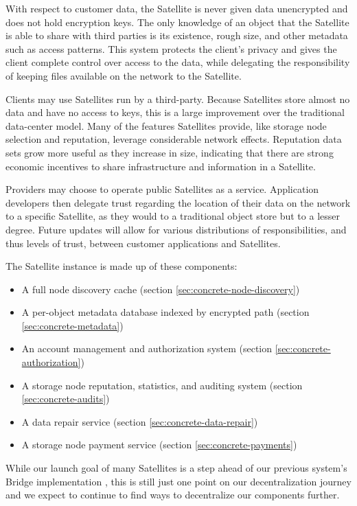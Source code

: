 \documentclass[8pt,fleqn,openany]{book}
\begin{document}
With respect to customer data, the Satellite is
never given data unencrypted and does not hold encryption keys.
The only knowledge of an object that the Satellite is able to share with
third parties is its existence, rough size, and other metadata such as access
patterns.
This system protects the client's privacy and gives the client complete
control over access to the data,
while delegating the responsibility of keeping files available on the network
to the Satellite.

Clients may use Satellites run by a third-party. Because Satellites store almost no
data and have no access to keys, this is a large improvement over the
traditional data-center model. Many of the features Satellites provide, like
storage node selection and reputation, leverage considerable network effects.
Reputation data sets grow more useful as they increase in size,
indicating that there are strong economic incentives to share infrastructure
and information in a Satellite.

Providers may choose to operate public Satellites as a service.
Application developers then delegate trust regarding the location of their
data on the network to a specific Satellite, as they
would to a traditional object store but to a lesser degree. Future updates
will allow for various distributions of responsibilities, and thus levels of
trust, between customer applications and Satellites.

The Satellite instance is made up of these components:
\begin{itemize}
\item A full node discovery cache (section \ref{sec:concrete-node-discovery})
\item A per-object metadata database indexed by encrypted path
  (section \ref{sec:concrete-metadata})
\item An account management and authorization system
  (section \ref{sec:concrete-authorization})
\item A storage node reputation, statistics, and auditing system
  (section \ref{sec:concrete-audits})
\item A data repair service (section \ref{sec:concrete-data-repair})
\item A storage node payment service (section \ref{sec:concrete-payments})
\end{itemize}

While our launch goal of many Satellites is a step ahead of our previous
system's Bridge implementation \cite{storj-v2}, this is still just one point on
our decentralization journey and we expect to continue to find ways to
decentralize our components further.
\end{document}
